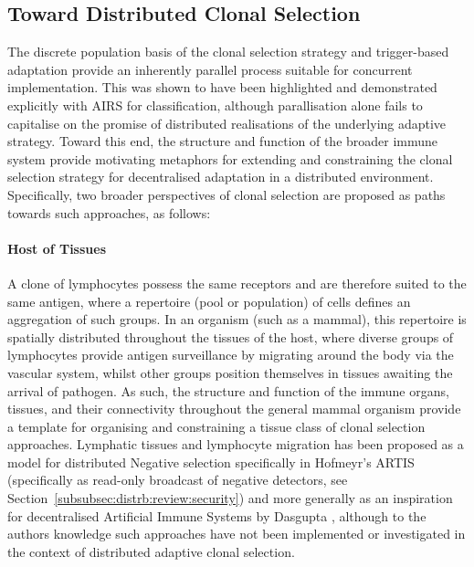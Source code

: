 %
%
\subsection{Toward Distributed Clonal Selection}
The discrete population basis of the clonal selection strategy and trigger-based adaptation provide an inherently parallel process suitable for concurrent implementation. This was shown to have been highlighted and demonstrated explicitly with AIRS for classification, although parallisation alone fails to capitalise on the promise of distributed realisations of the underlying adaptive strategy. 
Toward this end, the structure and function of the broader immune system provide motivating metaphors for extending and constraining the clonal selection strategy for decentralised adaptation in a distributed environment. Specifically, two broader perspectives of clonal selection are proposed as paths towards such approaches, as follows:

%
%
\paragraph{Host of Tissues}
A clone of lymphocytes possess the same receptors and are therefore suited to the same antigen, where a repertoire (pool or population) of cells defines an aggregation of such groups. In an organism (such as a mammal), this repertoire is spatially distributed throughout the tissues of the host, where diverse groups of lymphocytes provide antigen surveillance by migrating around the body via the vascular system, whilst other groups position themselves in tissues awaiting the arrival of pathogen. As such, the structure and function of the immune organs, tissues, and their connectivity throughout the general mammal organism provide a template for organising and constraining a tissue class of clonal selection approaches. Lymphatic tissues and lymphocyte migration has been proposed as a model for distributed Negative selection specifically in Hofmeyr's ARTIS (specifically as read-only broadcast of negative detectors, see Section~\ref{subsubsec:distrb:review:security}) and more generally as an inspiration for decentralised Artificial Immune Systems by Dasgupta \cite{Dasgupta1999c}, although to the authors knowledge such approaches have not been implemented or investigated in the context of distributed adaptive clonal selection.

%
%

